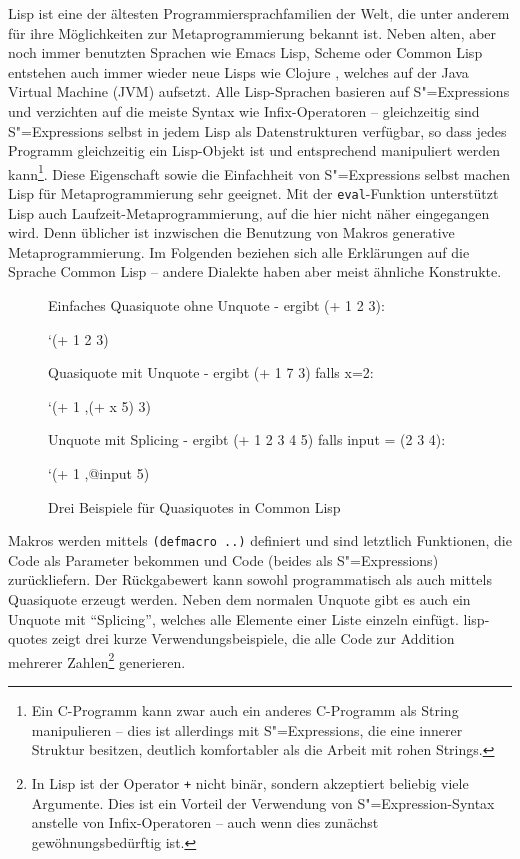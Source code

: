 \documentclass[11pt, a4paper, bibgerm]{scrbook}
\newenvironment{DIFnomarkup}{}{}
\newcommand\icode[1]{\lstinline?#1?}
\newcommand\abb{}
\newcommand{\sexp}{S"=Expression}
\newcommand{\sexps}{S"=Expressions}
\begin{document}
Lisp ist eine der ältesten Programmiersprachfamilien der Welt, die unter
anderem für ihre Möglichkeiten zur Metaprogrammierung bekannt ist. Neben
alten, aber noch immer benutzten Sprachen wie Emacs Lisp, Scheme oder
Common Lisp entstehen auch immer wieder neue Lisps wie
Clojure \cite{Clojure}, welches auf der Java Virtual Machine (JVM)
aufsetzt. Alle Lisp-Sprachen basieren auf \sexps{} und verzichten auf
die meiste Syntax wie Infix-Operatoren -- gleichzeitig sind \sexps{}
selbst in jedem Lisp als Datenstrukturen verfügbar, so dass jedes
Programm gleichzeitig ein Lisp-Objekt ist und entsprechend manipuliert
werden kann\footnote{Ein C-Programm kann zwar auch ein anderes
  C-Programm als String manipulieren -- dies ist allerdings mit \sexps{},
  die eine innerer Struktur besitzen, deutlich komfortabler als die
  Arbeit mit rohen Strings.}. Diese Eigenschaft sowie die Einfachheit von
\sexps{} selbst machen Lisp für Metaprogrammierung sehr geeignet. Mit
der \icode{eval}-Funktion unterstützt Lisp auch
Laufzeit-Metaprogrammierung, auf die hier nicht näher eingegangen
wird. Denn üblicher ist inzwischen die Benutzung von Makros generative
Metaprogrammierung. Im Folgenden beziehen sich alle
Erklärungen auf die Sprache Common Lisp -- andere Dialekte haben aber
meist ähnliche Konstrukte.

\begin{figure}[h]
  \centering
  \begin{DIFnomarkup}\begin{code}
Einfaches Quasiquote ohne Unquote - ergibt (+ 1 2 3):

 `(+ 1 2 3)


Quasiquote mit Unquote - ergibt (+ 1 7 3) falls x=2:

`(+ 1 ,(+ x 5) 3)


Unquote mit Splicing - ergibt (+ 1 2 3 4 5) falls input = (2 3 4):

`(+ 1 ,@input 5)
  \end{code}\end{DIFnomarkup}
  \caption{Drei Beispiele für Quasiquotes in Common Lisp}
  \label{magicl:fig:lisp-quotes}
\end{figure}

Makros werden mittels \icode{(defmacro ..)} definiert und sind letztlich
Funktionen, die Code als Parameter bekommen und Code (beides als
\sexps{}) zurückliefern. Der Rückgabewert kann sowohl programmatisch als
auch mittels Quasiquote erzeugt werden. Neben dem normalen Unquote gibt
es auch ein Unquote mit "`Splicing"', welches alle Elemente einer Liste
einzeln einfügt. \abb{lisp-quotes} zeigt drei kurze
Verwendungsbeispiele, die alle Code zur Addition mehrerer
Zahlen\footnote{In Lisp ist der Operator \icode{+} nicht binär, sondern
  akzeptiert beliebig viele Argumente. Dies ist ein Vorteil der
  Verwendung von \sexp{}-Syntax anstelle von Infix-Operatoren -- auch
  wenn dies zunächst gewöhnungsbedürftig ist.} generieren.
\end{document}
